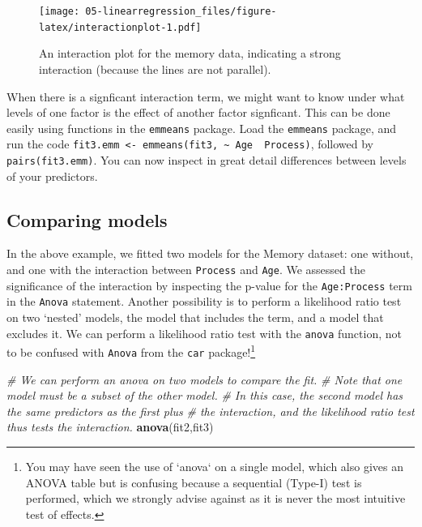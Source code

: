 \documentclass[]{book}
\newenvironment{Shaded}{\begin{snugshade}}{\end{snugshade}}
\newcommand{\CommentTok}[1]{\textcolor[rgb]{0.56,0.35,0.01}{\textit{#1}}}
\newcommand{\KeywordTok}[1]{\textcolor[rgb]{0.13,0.29,0.53}{\textbf{#1}}}
\newcommand{\NormalTok}[1]{#1}
\let\rmarkdownfootnote\footnote%
\def\footnote{\protect\rmarkdownfootnote}
\let\BeginKnitrBlock\begin \let\EndKnitrBlock\end
\begin{document}
\begin{figure}
\centering
\texttt{[image: 05-linearregression\_files/figure-latex/interactionplot-1.pdf]}
\caption{\label{fig:interactionplot}An interaction plot for the memory data, indicating a strong interaction (because the lines are not parallel).}
\end{figure}

\BeginKnitrBlock{rmdtry}
When there is a signficant interaction term, we might want to know under what levels of one factor is the effect of another factor signficant. This can be done easily using functions in the \texttt{emmeans} package. Load the \texttt{emmeans} package, and run the code \texttt{fit3.emm\ \textless{}-\ emmeans(fit3,\ \textasciitilde{}\ Age\ \textbar{}\ Process)}, followed by \texttt{pairs(fit3.emm)}. You can now inspect in great detail differences between levels of your predictors.
\EndKnitrBlock{rmdtry}

\hypertarget{comparing-models}{%
\subsection{Comparing models}\label{comparing-models}}

In the above example, we fitted two models for the Memory dataset: one without, and one with the interaction between \texttt{Process} and \texttt{Age}. We assessed the significance of the interaction by inspecting the p-value for the \texttt{Age:Process} term in the \texttt{Anova} statement. Another possibility is to perform a likelihood ratio test on two `nested' models, the model that includes the term, and a model that excludes it. We can perform a likelihood ratio test with the \texttt{anova} function, not to be confused with \texttt{Anova} from the \texttt{car} package!\footnote{You may have seen the use of `anova` on a single model, which also gives an ANOVA table but is confusing because a sequential (Type-I) test is performed, which we strongly advise against as it is never the most intuitive test of effects.}

\begin{Shaded}
\begin{Highlighting}[]
\CommentTok{# We can perform an anova on two models to compare the fit.}
\CommentTok{# Note that one model must be a subset of the other model. }
\CommentTok{# In this case, the second model has the same predictors as the first plus}
\CommentTok{# the interaction, and the likelihood ratio test thus tests the interaction.}
\KeywordTok{anova}\NormalTok{(fit2,fit3)}
\end{Highlighting}
\end{Shaded}
\end{document}
